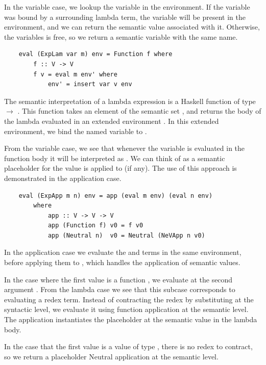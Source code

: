 In the variable case, we lookup the variable in the environment. If the variable was bound by a surrounding lambda term, the variable will be present in the environment, and we can return the semantic value associated with it. Otherwise, the variables is free, so we return a semantic variable with the same name.

\begin{lstlisting}
    eval (ExpLam var m) env = Function f where
        f :: V -> V
        f v = eval m env' where
            env' = insert var v env
\end{lstlisting}

The semantic interpretation of a lambda expression is a Haskell function of type  $\rightarrow$ . This function takes an element  of the semantic set , and returns the body of the lambda evaluated in an extended environment . In this extended environment, we bind the named variable  to .

From the variable case, we see that whenever the variable  is evaluated in the function body it will be interpreted as . We can think of  as a semantic placeholder for the value  is applied to (if any). The use of this approach is demonstrated in the application case.

\begin{lstlisting}
    eval (ExpApp m n) env = app (eval m env) (eval n env)
        where
            app :: V -> V -> V
            app (Function f) v0 = f v0
            app (Neutral n)  v0 = Neutral (NeVApp n v0)
\end{lstlisting}

In the application case we evaluate the  and  terms in the same environment, before applying them to , which handles the application of semantic values. 

In the case where the first value is a function , we evaluate  at the second argument . From the lambda case we see that this subcase corresponds to evaluating a redex term. Instead of contracting the redex by substituting at the syntactic level, we evaluate it using function application at the semantic level. The application instantiates the placeholder  at the semantic value  in the lambda body. 

In the case that the first value is a value  of type , there is no redex to contract, so we return a placeholder Neutral application at the semantic level.


